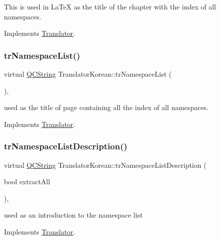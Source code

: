 This is used in La\+TeX as the title of the chapter with the index of all namespaces. 

Implements \mbox{\hyperlink{class_translator}{Translator}}.

\mbox{\label{class_translator_korean_a2f48a9a529be94f9147c6bccee403ed2}} 
\subsubsection{\texorpdfstring{trNamespaceList()}{trNamespaceList()}}
{\footnotesize\ttfamily virtual \mbox{\hyperlink{class_q_c_string}{Q\+C\+String}} Translator\+Korean\+::tr\+Namespace\+List (\begin{DoxyParamCaption}{ }\end{DoxyParamCaption})\hspace{0.3cm}{\ttfamily [inline]}, {\ttfamily [virtual]}}

used as the title of page containing all the index of all namespaces. 

Implements \mbox{\hyperlink{class_translator}{Translator}}.

\mbox{\label{class_translator_korean_a58c3ecd46779c0794c9edafff4d6d25d}} 
\subsubsection{\texorpdfstring{trNamespaceListDescription()}{trNamespaceListDescription()}}
{\footnotesize\ttfamily virtual \mbox{\hyperlink{class_q_c_string}{Q\+C\+String}} Translator\+Korean\+::tr\+Namespace\+List\+Description (\begin{DoxyParamCaption}\item[{bool}]{extract\+All }\end{DoxyParamCaption})\hspace{0.3cm}{\ttfamily [inline]}, {\ttfamily [virtual]}}

used as an introduction to the namespace list 

Implements \mbox{\hyperlink{class_translator}{Translator}}.

